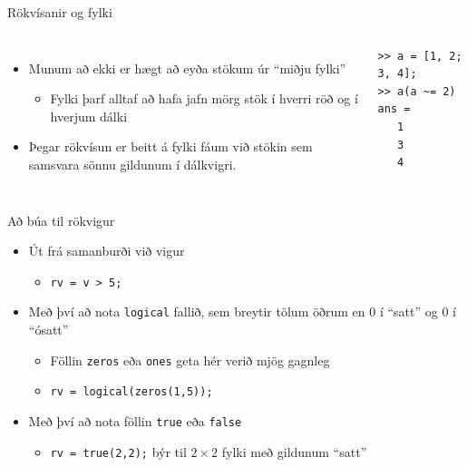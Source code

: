 \documentclass{beamer}
\begin{document}
\begin{frame}[fragile]{Rökvísanir og fylki}
\begin{columns}
\begin{itemize}
 \item Munum að ekki er hægt að eyða stökum úr ``miðju fylki''
 \begin{itemize}
  \item Fylki þarf alltaf að hafa jafn mörg stök í hverri röð og í hverjum dálki
 \end{itemize}
 \item Þegar rökvísun er beitt á fylki fáum við stökin sem samsvara sönnu gildunum í dálkvigri.
\end{itemize}
\begin{verbatim}
>> a = [1, 2; 3, 4];
>> a(a ~= 2)
ans =
   1
   3
   4
\end{verbatim}
\end{columns}
\end{frame}

\begin{frame}{Að búa til rökvigur}
\begin{itemize}
 \item Út frá samanburði við vigur
 \begin{itemize}
  \item \texttt{rv = v > 5;}
 \end{itemize}
 \item Með því að nota \texttt{logical} fallið, sem breytir tölum öðrum en 0 í ``satt'' og 0 í ``ósatt''
 \begin{itemize}
  \item Föllin \texttt{zeros} eða \texttt{ones} geta hér verið mjög gagnleg
  \item \texttt{rv = logical(zeros(1,5));}
 \end{itemize}
 \item Með því að nota föllin \texttt{true} eða \texttt{false}
 \begin{itemize}
  \item \texttt{rv = true(2,2);} býr til $2 \times 2$ fylki með gildunum ``satt''
 \end{itemize}
\end{itemize}
\end{frame}
\end{document}
